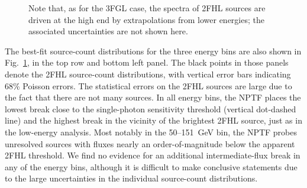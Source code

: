 \begin{figure}[phtb]
{   Note that, as for the 3FGL case, the spectra of 2FHL sources are driven at the high end by extrapolations from lower energies; the associated uncertainties are not shown here. }
   \label{fig:dndsdata_HE}
\end{figure}

The best-fit source-count distributions for the three energy bins are also shown in Fig.~\ref{fig:dndsdata_HE}, in the top row and bottom left panel.  The black points in those panels denote the 2FHL source-count distributions, with vertical error bars indicating 68\% Poisson errors.  The statistical errors on the 2FHL sources are large due to the fact that there are not many sources.  In all energy bins, the NPTF places the lowest break close to the single-photon sensitivity threshold (vertical dot-dashed line) and the highest break in the vicinity of the brightest 2FHL source, just as in the low-energy analysis.  Most notably in the 50--151~GeV bin, the NPTF probes unresolved sources with fluxes nearly an order-of-magnitude below the apparent 2FHL threshold.  We find no evidence for an additional intermediate-flux break in any of the energy bins, although it is difficult to make conclusive statements due to the large uncertainties in the individual source-count distributions. 


